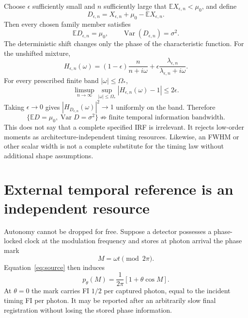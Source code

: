 \documentclass[aps,prapplied,preprint,nofootinbib]{revtex4-2}
\begin{document}
Choose $\epsilon$ sufficiently small and $n$ sufficiently large that $\mathbb E X_{\epsilon,n}<\mu_0$, and define
\begin{equation}
D_{\epsilon,n}=X_{\epsilon,n}
+\mu_0-\mathbb E X_{\epsilon,n}.
\end{equation}
Then every chosen family member satisfies
\begin{equation}
\boxed{
\mathbb E D_{\epsilon,n}=\mu_0,
\qquad
\operatorname{Var}(D_{\epsilon,n})=\sigma^2.}
\end{equation}
The deterministic shift changes only the phase of the characteristic function. For the unshifted mixture,
\begin{equation}
H_{\epsilon,n}(\omega)
=(1-\epsilon)\frac{n}{n+i\omega}
+\epsilon\frac{\lambda_{\epsilon,n}}{\lambda_{\epsilon,n}+i\omega}.
\end{equation}
For every prescribed finite band $|\omega|\le\Omega_*$,
\begin{equation}
\limsup_{n\to\infty}
\sup_{|\omega|\le\Omega_*}
|H_{\epsilon,n}(\omega)-1|
\le2\epsilon.
\end{equation}
Taking $\epsilon\to0$ gives $|H_{D_{\epsilon,n}}(\omega)|^2\to1$ uniformly on the band. Therefore
\begin{equation}
\boxed{
\{\mathbb E D=\mu_0,\operatorname{Var}D=\sigma^2\}
\not\Rightarrow
\text{finite temporal information bandwidth}.}
\end{equation}
This does not say that a complete specified IRF is irrelevant. It rejects low-order moments as architecture-independent timing resources. Likewise, an FWHM or other scalar width is not a complete substitute for the timing law without additional shape assumptions.



\section{External temporal reference is an independent resource}
\label{sec:clock}

Autonomy cannot be dropped for free. Suppose a detector possesses a phase-locked clock at the modulation frequency and stores at photon arrival the phase mark
\begin{equation}
M=\omega t\pmod{2\pi}.
\end{equation}
Equation~\eqref{eq:source} then induces
\begin{equation}
p_\theta(M)=\frac{1}{2\pi}[1+\theta\cos M].
\end{equation}
At $\theta=0$ the mark carries FI $1/2$ per captured photon, equal to the incident timing FI per photon. It may be reported after an arbitrarily slow final registration without losing the stored phase information.
\end{document}
